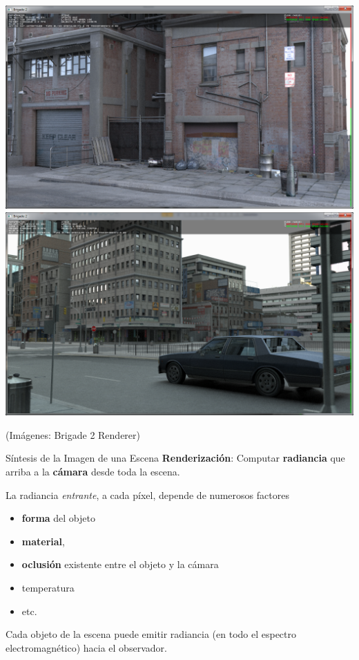 \documentclass[spanish,unknownkeysallowed]{beamer}
\begin{document}
\begin{frame}

\includegraphics[scale = 0.18]{../figures/hd1.png}
\includegraphics[scale = 0.18]{../figures/blinn5ed.png}

(Imágenes: Brigade 2 Renderer)


\end{frame}




\begin{frame}{Síntesis de la Imagen de una Escena}
\textbf{Renderización}:
Computar \textbf{radiancia} que arriba a la \textbf{cámara} desde toda la escena.

\vspace{0.4cm}
La radiancia \textit{entrante}, a cada píxel, depende de numerosos factores
\begin{itemize}
\item \textbf{forma} del objeto
\item \textbf{material}, 
\item \textbf{oclusión} existente entre el objeto y la cámara
\item temperatura
\item etc.
\end{itemize}


\vspace{0.4cm}
Cada objeto de la escena puede emitir radiancia (en todo el espectro electromagnético) hacia el observador.

\end{frame}
\end{document}
